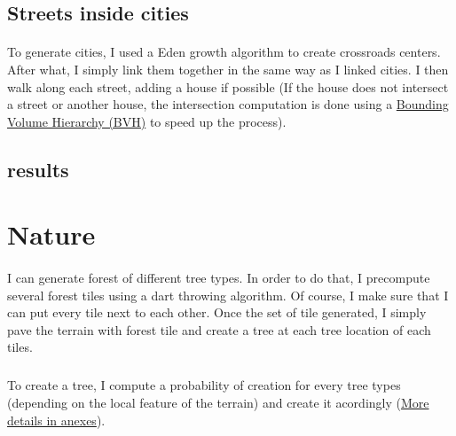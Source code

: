 \documentclass[a4paper,12pt]{article}
\begin{document}
\subsection*{Streets inside cities}

\paragraph{} To generate cities, I used a Eden growth algorithm to create crossroads centers. After what, I simply link them together in the same way as I linked cities. I then walk along each street, adding a house if possible (If the house does not intersect a street or another house, the intersection computation is done using a \hyperref[sec:anexe_bvh]{Bounding Volume Hierarchy (BVH)} to speed up the process).

\subsection*{results}


\section*{Nature}

\paragraph{} I can generate forest of different tree types.
\newline In order to do that, I precompute several forest tiles using a dart throwing algorithm. Of course, I make sure that I can put every tile next to each other. Once the set of tile generated, I simply pave the terrain with forest tile and create a tree at each tree location of each tiles.

\subparagraph{} To create a tree, I compute a probability of creation for every tree types (depending on the local feature of the terrain) and create it acordingly (\hyperref[sec:anexe_tree]{More details in anexes}).
\end{document}
